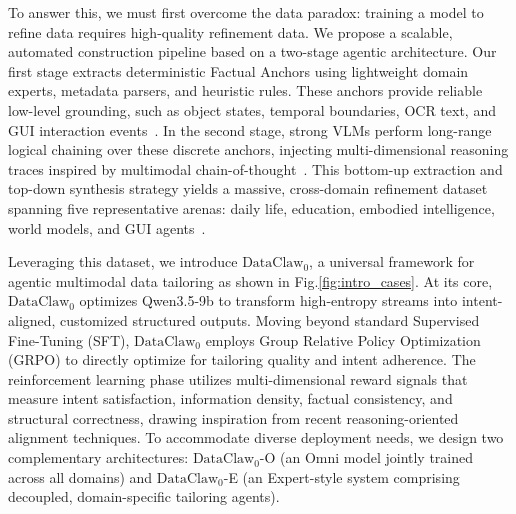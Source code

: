 



To answer this, we must first overcome the data paradox: training a model to refine data requires high-quality refinement data. We propose a scalable, automated construction pipeline based on a two-stage agentic architecture. Our first stage extracts deterministic Factual Anchors using lightweight domain experts, metadata parsers, and heuristic rules. These anchors provide reliable low-level grounding, such as object states, temporal boundaries, OCR text, and GUI interaction events~\cite{savva2019habitat,dai2017scannet,vlmad,spatialvlm,robospatial}. In the second stage, strong VLMs perform long-range logical chaining over these discrete anchors, injecting multi-dimensional reasoning traces inspired by multimodal chain-of-thought~\cite{zhang2023multimodalcot,chen2024measuring,qian2024visual}. This bottom-up extraction and top-down synthesis strategy yields a massive, cross-domain refinement dataset spanning five representative arenas: daily life, education, embodied intelligence, world models, and GUI agents~\cite{coin,omniworld,worldmem,epic-kitchens,wan2024grid,unireal,stepxedit,qwenimage,openvla,pi0,gr3,worldvla}.

Leveraging this dataset, we introduce \textbf{$\text{$\text{DataClaw}_0$}$}, a universal framework for agentic multimodal data tailoring as shown in Fig.\ref{fig:intro_cases}. At its core, $\text{DataClaw}_0$ optimizes Qwen3.5-9b to transform high-entropy streams into intent-aligned, customized structured outputs. Moving beyond standard Supervised Fine-Tuning (SFT), $\text{DataClaw}_0$ employs Group Relative Policy Optimization (GRPO)\cite{guo2025deepseekmathgrpo} to directly optimize for tailoring quality and intent adherence. The reinforcement learning phase utilizes multi-dimensional reward signals that measure intent satisfaction, information density, factual consistency, and structural correctness, drawing inspiration from recent reasoning-oriented alignment techniques\cite{rafailov2024dpo,sun2024llava-rlhf,wang2024reasoning,li2024enhancing}. To accommodate diverse deployment needs, we design two complementary architectures: $\text{DataClaw}_0$-O (an Omni model jointly trained across all domains) and $\text{DataClaw}_0$-E (an Expert-style system comprising decoupled, domain-specific tailoring agents).



